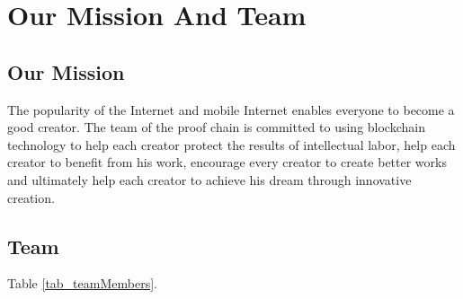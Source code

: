 \documentclass[a4paper,oneside,openany]{tufte-book}
\begin{document}


\chapter{Our Mission And Team}

\section{Our Mission}

\begin{quote}
\textsf{}
\end{quote}


The popularity of the Internet and mobile Internet enables everyone to become a good creator. The team of the proof chain is committed to using blockchain technology to help each creator protect the results of intellectual labor, help each creator to benefit from his work, encourage every creator to create better works and ultimately help each creator to achieve his dream through innovative creation.



\section{Team}
Table \ref{tab_teamMembers}.
\end{document}
